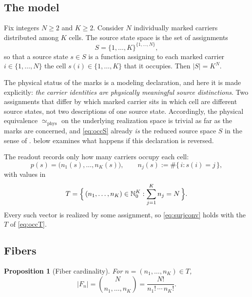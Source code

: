 \documentclass[11pt,reqno]{amsart}
\theoremstyle{plain}
\newtheorem{proposition}[theorem]{Proposition}
\theoremstyle{definition}
\theoremstyle{remark}
\newcommand{\phe}{\simeq_{\mathrm{phys}}}
\newcommand{\Nz}{\mathbb{N}_{0}}
\begin{document}
\subsection{The model}

Fix integers $N\geq 2$ and $K\geq 2$. Consider $N$ individually marked carriers distributed among $K$ cells. The source state space is the set of assignments
\begin{equation}
\label{eq:occS}
S=\{1,\ldots,K\}^{\{1,\ldots,N\}},
\end{equation}
so that a source state $s\in S$ is a function assigning to each marked carrier $i\in\{1,\ldots,N\}$ the cell $s(i)\in\{1,\ldots,K\}$ that it occupies. Then $|S|=K^{N}$.

The physical status of the marks is a modeling declaration, and here it is made explicitly: \emph{the carrier identities are physically meaningful source distinctions}. Two assignments that differ by which marked carrier sits in which cell are different source states, not two descriptions of one source state. Accordingly, the physical equivalence $\phe$ on the underlying realization space is trivial as far as the marks are concerned, and \eqref{eq:occS} already \emph{is} the reduced source space $S$ in the sense of .  below examines what happens if this declaration is reversed.

The readout records only how many carriers occupy each cell:
\begin{equation}
\label{eq:occreadout}
p(s)=\bigl(n_{1}(s),\ldots,n_{K}(s)\bigr),
\qquad
n_{j}(s):=\#\{\, i : s(i)=j \,\},
\end{equation}
with values in
\begin{equation}
\label{eq:occT}
T=\Bigl\{\, (n_{1},\ldots,n_{K})\in\Nz^{K} : \sum_{j=1}^{K}n_{j}=N \,\Bigr\}.
\end{equation}
Every such vector is realized by some assignment, so \eqref{eq:surjconv} holds with the $T$ of \eqref{eq:occT}.

\subsection{Fibers}

\begin{proposition}[Fiber cardinality]
\label{prop:multinomial}
For $n=(n_{1},\ldots,n_{K})\in T$,
\begin{equation}
\label{eq:multinomial}
|F_{n}|=\binom{N}{n_{1},\ldots,n_{K}}=\frac{N!}{n_{1}!\,\cdots\,n_{K}!}.
\end{equation}
\end{proposition}
\end{document}
